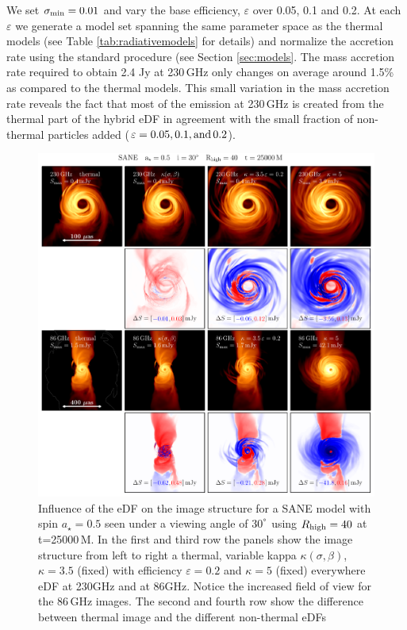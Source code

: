 We set $\sigma_{\rm min}=0.01$ and vary the base efficiency, $\varepsilon$ over 0.05, 0.1 and 0.2.
At each $\varepsilon$ we generate a model set spanning the same parameter space as the thermal models (see Table \ref{tab:radiativemodels} for details) and normalize the accretion rate using the standard procedure (see Section \ref{sec:models}.
The mass accretion rate required to obtain 2.4 Jy at 230\,GHz only changes on average around 1.5\% as compared to the thermal models.
This small variation in the mass accretion rate reveals the fact that most of the emission at 230\,GHz is created from the thermal part of the hybrid eDF in agreement with the small fraction of non-thermal particles added ($\varepsilon=0.05,0.1,\rm{and}\,0.2$).

\begin{figure}[t!]
  \centering
  \includegraphics[width=\textwidth]{./figures/SANE_eDFs_diff.pdf}
  \caption{Influence of the eDF on the image structure for a SANE model with spin $a_{\star}=0.5$ seen under a viewing angle of 30$^\degree$ using $R_{\rm high}=40$ at t=25000\,M.
In the first and third row the panels show the image structure from left to right a thermal, variable kappa $\kappa(\sigma,\beta)$, $\kappa=3.5$ (fixed) with efficiency $\varepsilon=0.2$ and $\kappa=5$ (fixed) everywhere eDF at 230GHz and at 86GHz.
Notice the increased field of view for the 86\,GHz images.
The second and fourth row show the difference between thermal image and the different non-thermal eDFs}
  \label{fig:SANE_edfs}
\end{figure}


